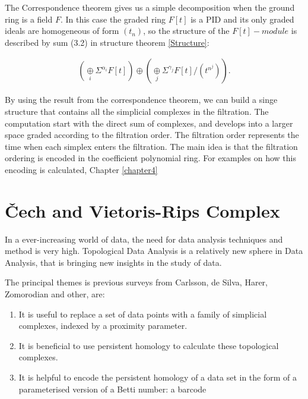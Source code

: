 \documentclass[11pt,a4paper]{report}
\begin{document}
            The Correspondence theorem gives us a simple decomposition when the ground ring is a field $F$. In this case the graded ring $F[t]$ is a PID and its only graded ideals are homogeneous of form $(t_n)$, so the structure of the $F[t]-module$ is described by sum (3.2) in structure theorem \ref{Structure}:

            \begin{align}
                (\underset{i}{\oplus} \Sigma^{\alpha_i} F[t]) \oplus (\underset{j}{\oplus} \Sigma ^{\gamma_j} F[t]/(t^{n^j})).
              \end{align}
              
              By using the result from the correspondence theorem, we can build a singe structure that contains all the simplicial complexes in the filtration. The computation start with the direct sum of complexes, and develops into a larger space graded according to the filtration order. The filtration order represents the time when each simplex enters the filtration. The main idea is that the filtration ordering is encoded in the coefficient
              polynomial ring. For examples on how this encoding is calculated, Chapter \ref{chapter4}
              
              
              \section{\v{C}ech and Vietoris-Rips Complex}
              \label{CechRips}
              
              In a ever-increasing world of data, the need for data analysis techniques and method is very high. 
              Topological Data Analysis is a relatively new sphere in Data Analysis, that is bringing new insights in the study of data. 
              
              The principal themes is previous surveys from Carlsson, de Silva, Harer, Zomorodian and other, are:
              \begin{enumerate}
               \item It is useful to replace a set of data points with a family of simplicial complexes, indexed by a 
               proximity parameter. 
               \item It is beneficial to use persistent homology to calculate these topological complexes.
               \item It is helpful to encode the persistent homology of a data set in the form
of a parameterised version of a Betti number: a barcode
              \end{enumerate}
              
\end{document}
